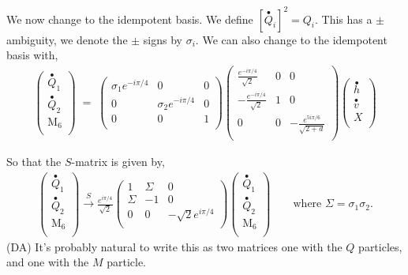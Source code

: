 \documentclass[12pt,a4paper]{article}
\newcounter{arrow}
\newcommand{\dave}[1]{{\color{ao(english)}\footnotesize{(DA) #1}}}
\begin{document}
We now change to the idempotent basis. 
We define $\left[ \stackrel{\bullet}{Q}_{i}\right]^2  = Q_i$. 
This has a $\pm$ ambiguity, we denote the $\pm$ signs by $\sigma_i$. 
We can also change to the idempotent basis with,
\begin{align}
\left( \begin{matrix}
\stackrel{\bullet}{Q}_{1}\\
\stackrel{\bullet}{Q}_{2}\\
\text{M}_6 \\ 
\end{matrix} \right) \; =\;
\left( \begin{matrix}
\sigma_1 e^{- i \pi /4} &0&0\\
0&\sigma_2 e^{- i \pi /4} &0\\
0&0&1 \\
\end{matrix} \right)
\left( \begin{matrix}
\frac{e^{- i \pi /4}}{\sqrt{2}} & 0&0 \\
- \frac{e^{- i \pi /4}}{\sqrt{2}} & 1 & 0 \\
0 & 0& - \frac{e^{5 i \pi /6}}{\sqrt{2 + d}}\\
\end{matrix} \right)
\left( \begin{matrix}
\stackrel{\bullet}{h} \\
\stackrel{\bullet}{v} \\
X \\
\end{matrix} \right)
\end{align}

So that the $S$-matrix is given by,
\begin{align}
\left( \begin{matrix}
\stackrel{\bullet}{Q}_{1}\\
\stackrel{\bullet}{Q}_{2}\\
\text{M}_6 \\ 
\end{matrix} \right) \xrightarrow{S}
\frac{e^{i \pi /4}}{\sqrt{2}}\left( \begin{matrix} 
1&\Sigma &0 \\
\Sigma &-1&0\\
0&0& -\sqrt{2} e^{i \pi /4}\\
\end{matrix} \right)
\left( \begin{matrix}
\stackrel{\bullet}{Q}_{1}\\
\stackrel{\bullet}{Q}_{2}\\
\text{M}_6 \\ 
\end{matrix} \right)
\quad \quad \text{where $\Sigma = \sigma_1 \sigma_2$.}
\end{align}
\dave{It's probably natural to write this as two matrices one with the $Q$ particles, and one with the $M$ particle.}
\end{document}
